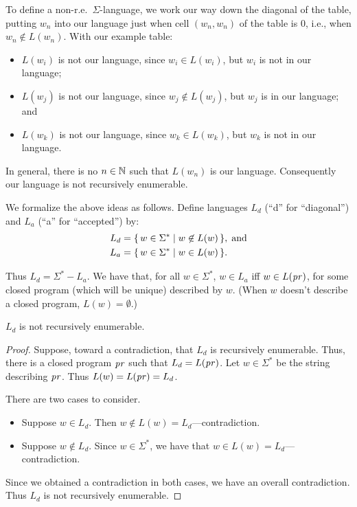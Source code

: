 To define a non-r.e.\ $\Sigma$-language, we work our way down the diagonal of
the table, putting $w_n$ into our language just when cell $(w_n,w_n)$
of the table is $0$, i.e., when $w_n\not\in L(w_n)$.
With our example table:
\begin{itemize}
\item $L(w_i)$ is not our language, since $w_i\in L(w_i)$, but $w_i$
  is not in our language;

\item $L(w_j)$ is not our language, since $w_j\not\in L(w_j)$, but
  $w_j$ is in our language; and

\item $L(w_k)$ is not our language, since $w_k\in L(w_k)$, but $w_k$
  is not in our language.
\end{itemize}
In general, there is no $n\in\mathbb{N}$ such that $L(w_n)$ is our
language.  Consequently our language is not recursively enumerable.

We formalize the above ideas as follows.  Define languages
$L_d$ (``d'' for ``diagonal'') and $L_a$ (``a'' for ``accepted'') by:
\begin{align*}
L_d &= \{ \, w\in\Sigma^* \mid w\not\in L(w) \, \} , \;\allowbreak\mbox{and}\allowbreak \\
L_a &= \{ \, w\in\Sigma^* \mid w\in L(w) \, \} .
\end{align*}

Thus $L_d = \Sigma^* - L_a$.  We have that, for all $w\in\Sigma^*$,
$w\in L_a$ iff $w\in L(\mathit{pr})$, for some closed program (which will be
unique) described by $w$. (When $w$ doesn't describe a closed program,
$L(w)=\emptyset$.)

\begin{theorem}
$L_d$ is not recursively enumerable.
\end{theorem}

\begin{proof}
Suppose, toward a contradiction, that $L_d$ is recursively
enumerable.  Thus, there is a closed program $\mathit{pr}$ such that
$L_d=L(\mathit{pr})$.  Let $w\in\Sigma^*$ be the string describing $\mathit{pr}$.
Thus $L(w)=L(\mathit{pr})=L_d$.

There are two cases to consider.
\begin{itemize}
\item Suppose $w\in L_d$.  Then $w\not\in L(w)=L_d$---contradiction.

\item Suppose $w\not\in L_d$.  Since $w\in\Sigma^*$, we have that
  $w\in L(w)=L_d$---contradiction.
\end{itemize}
Since we obtained a contradiction in both cases, we have an
overall contradiction.  Thus $L_d$ is not recursively enumerable.
\end{proof}

